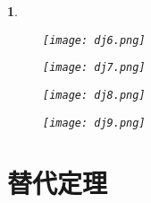 \documentclass[UTF8]{report}
\theoremstyle{MyLineTheoremStyle} %
\theoremstyle{MyBlockTheoremStyle} %
\theoremstyle{MySubsubsectionStyle} %
\newtheorem{definition}{}
\begin{document}
\begin{definition}
    \begin{figure}[H]
        \centering
        \texttt{[image: dj6.png]}
    \end{figure}

    \begin{figure}[H]
        \centering
        \texttt{[image: dj7.png]}
    \end{figure}

    \begin{figure}[H]
        \centering
        \texttt{[image: dj8.png]}
    \end{figure}

    \begin{figure}[H]
        \centering
        \texttt{[image: dj9.png]}
    \end{figure}
\end{definition}

\cleardoublepage

\section{替代定理}
\end{document}

